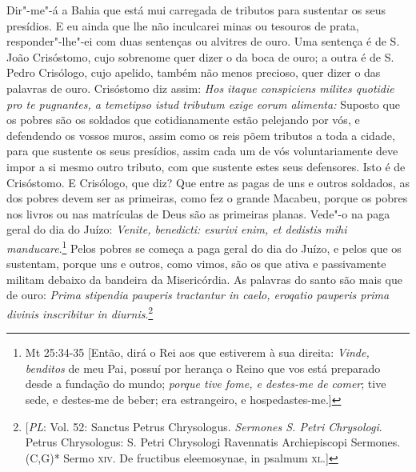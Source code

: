 Dir"-me"-á a Bahia que está mui carregada de tributos para sustentar os
seus presídios. E eu ainda que lhe não inculcarei minas ou tesouros de
prata, responder"-lhe"-ei com duas sentenças ou alvitres de ouro. Uma
sentença é de S.\,João Crisóstomo, cujo sobrenome quer dizer o da boca de
ouro; a outra é de S.\,Pedro Crisólogo, cujo apelido, também não menos
precioso, quer dizer o das palavras de ouro. Crisóstomo diz assim:
\emph{Hos itaque conspiciens milites quotidie pro te pugnantes, a
temetipso istud tributum exige eorum alimenta:} Suposto que os pobres
são os soldados que cotidianamente estão pelejando por vós, e defendendo
os vossos muros, assim como os reis põem tributos a toda a cidade, para
que sustente os seus presídios, assim cada um de vós voluntariamente
deve impor a si mesmo outro tributo, com que sustente estes seus
defensores. Isto é de Crisóstomo. E Crisólogo, que diz? Que entre as
pagas de uns e outros soldados, as dos pobres devem ser as primeiras,
como fez o grande Macabeu, porque os pobres nos livros ou nas matrículas
de Deus são as primeiras planas. Vede"-o na paga geral do dia do Juízo:
\emph{Venite, benedicti: esurivi enim, et dedistis mihi
manducare}.\footnote{Mt 25:34-35 [Então, dirá o Rei aos que estiverem à sua direita: \textit{Vinde, benditos} de meu Pai, possuí por herança o Reino que vos está preparado desde a fundação do mundo; \textit{porque tive fome, e destes-me de comer}; tive sede, e destes-me de beber; era estrangeiro, e hospedastes-me.]} Pelos pobres se começa a paga geral do dia do
Juízo, e pelos que os sustentam, porque uns e outros, como vimos, são os
que ativa e passivamente militam debaixo da bandeira da Misericórdia. As
palavras do santo são mais que de ouro: \emph{Prima stipendia pauperis
tractantur in caelo, eroqatio pauperis prima divinis inscribitur in
diurnis}.\footnote{[\textit{PL}: Vol. 52: Sanctus Petrus Chrysologus. \textit{Sermones S. Petri Chrysologi}. Petrus Chrysologus: S. Petri Chrysologi Ravennatis Archiepiscopi Sermones. (C,G)* Sermo \textsc{xiv}. De fructibus eleemosynae, in psalmum \textsc{xl}.]}

